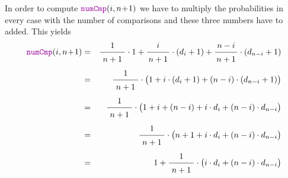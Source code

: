 In order to compute  $\mytt{numCmp}(i, n\!+\!1)$ we have to multiply the probabilities in every
case with the number of comparisons and these three numbers have to added.  This yields
\begin{eqnarray*}
  \mytt{numCmp}(i, n\!+\!1) 
& = & \bruch{1}{\,n+1\,} \cdot 1 + \bruch{i}{n+1} \cdot (d_i + 1) + \bruch{n-i}{n+1} \cdot (d_{n-i} + 1) 
      \\[0.2cm]
& = & \bruch{1}{\,n+1\,} \cdot \bigl(1 + i \cdot (d_i + 1) + (n-i) \cdot (d_{n-i} + 1)\bigr)      \\[0.2cm]
& = & \bruch{1}{\,n+1\,} \cdot \bigl(1 + i + (n-i) + i \cdot d_i + (n-i) \cdot d_{n-i} \bigr)    \\[0.2cm]
& = & \bruch{1}{\,n+1\,} \cdot \bigl(n + 1 + i \cdot d_i + (n-i) \cdot d_{n-i} \bigr)            \\[0.2cm]
& = & 1 + \bruch{1}{\,n+1\,} \cdot \bigl(i \cdot d_i + (n-i) \cdot d_{n-i} \bigr) 
\end{eqnarray*}


